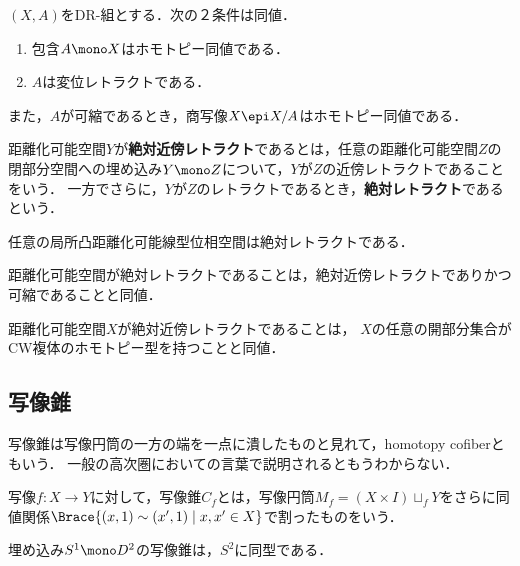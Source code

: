 \documentclass[uplatex, dvipdfmx]{jsreport}
\begin{document}
\begin{lemma}
    $(X,A)$をDR-組とする．次の２条件は同値．
    \begin{enumerate}
        \item 包含$A\mono X$はホモトピー同値である．
        \item $A$は変位レトラクトである．
    \end{enumerate}
    また，$A$が可縮であるとき，商写像$X\epi X/A$はホモトピー同値である．
\end{lemma}

\begin{definition}
    距離化可能空間$Y$が\textbf{絶対近傍レトラクト}であるとは，任意の距離化可能空間$Z$の閉部分空間への埋め込み$Y\mono Z$について，$Y$が$Z$の近傍レトラクトであることをいう．
    一方でさらに，$Y$が$Z$のレトラクトであるとき，\textbf{絶対レトラクト}であるという．
\end{definition}

\begin{example}
    任意の局所凸距離化可能線型位相空間は絶対レトラクトである．
\end{example}

\begin{lemma}
    距離化可能空間が絶対レトラクトであることは，絶対近傍レトラクトでありかつ可縮であることと同値．
\end{lemma}

\begin{theorem}[Cauty]
    距離化可能空間$X$が絶対近傍レトラクトであることは，
    $X$の任意の開部分集合がCW複体のホモトピー型を持つことと同値．
\end{theorem}

\subsection{写像錐}

\begin{tcolorbox}[colframe=ForestGreen, colback=ForestGreen!10!white,breakable,colbacktitle=ForestGreen!40!white,coltitle=black,fonttitle=\bfseries\sffamily,
title=]
    写像錐は写像円筒の一方の端を一点に潰したものと見れて，homotopy cofiberともいう．
    一般の高次圏においての言葉で説明されるともうわからない．
\end{tcolorbox}

\begin{definition}
    写像$f:X\to Y$に対して，写像錐$C_f$とは，写像円筒$M_f=(X\times I)\sqcup_fY$をさらに同値関係$\Brace{(x,1)\sim(x',1)\mid x,x'\in X}$で割ったものをいう．
\end{definition}
\begin{example}
    埋め込み$S^1\mono D^2$の写像錐は，$S^2$に同型である．
\end{example}
\end{document}
